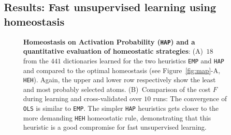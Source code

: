 \documentclass[letterpaper,final,conference,10pt]{IEEEtran}
\newcommand{\seeFig}[1]{Figure~\ref{fig:#1}}%
\begin{document}
\subsection{Results: Fast unsupervised learning using homeostasis}\label{results}
\begin{figure}%
\caption{
{\bf Homeostasis on Activation Probability (\texttt{HAP}) and a quantitative evaluation of homeostatic strategies}: %
 {\sf (A)}~$18$ from the $441$ dictionaries learned for the two heuristics \texttt{EMP} and \texttt{HAP} and compared to the optimal homeostasis (see \seeFig{map}-A, \texttt{HEH}).
 Again, the upper and lower row respectively show the least and most probably selected atoms.  {\sf (B)}~Comparison of the cost $F$ during learning and cross-validated over $10$ runs: The convergence of \texttt{OLS} is similar to \texttt{EMP}. The simpler \texttt{HAP} heuristics gets closer to the more demanding \texttt{HEH} homeostatic rule, demonstrating that this heuristic is a good compromise for fast unsupervised learning.
\label{fig:HAP}}%
\end{figure}%
\end{document}
